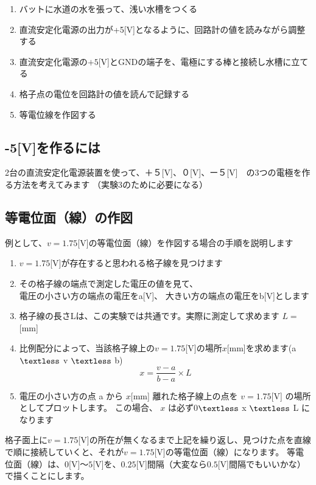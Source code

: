 \documentclass[uplatex,a4paper,11pt,oneside,openany]{jsbook}
\begin{document}
\begin{enumerate}
  \item バットに水道の水を張って、浅い水槽をつくる
  \item 直流安定化電源の出力が+5[V]となるように、回路計の値を読みながら調整する
  \item 直流安定化電源の$+5$[V]とGNDの端子を、電極にする棒と接続し水槽に立てる
  \item 格子点の電位を回路計の値を読んで記録する
  \item 等電位線を作図する
\end{enumerate}

\subsection{-5[V]を作るには}

2台の直流安定化電源装置を使って、＋５[V]、０[V]、ー５[V]　の3つの電極を作る方法を考えてみます
（実験3のために必要になる）

\newpage

\subsection{等電位面（線）の作図}

例として、$v=1.75$[V]の等電位面（線）を作図する場合の手順を説明します

\begin{enumerate}
  \item $v=1.75$[V]が存在すると思われる格子線を見つけます
  \item その格子線の端点で測定した電圧の値を見て、\\
  電圧の小さい方の端点の電圧をa[V]、
  大きい方の端点の電圧をb[V]とします
  \item 格子線の長さLは、この実験では共通です。実際に測定して求めます $L=$　　　[mm]
  \item 比例配分によって、当該格子線上の$v=1.75$[V]の場所$x$[mm]を求めます(a$\textless$ v $\textless$ b)
  \begin{equation*}x=\frac{v-a}{b-a}\times L\end{equation*}
  \item 電圧の小さい方の点 a から $x$[mm] 離れた格子線上の点を $v=1.75$[V] の場所としてプロットします。
  この場合、 $x$ は必ず0$\textless$ x $\textless$ L になります
\end{enumerate}

格子面上に$v=1.75$[V]の所在が無くなるまで上記を繰り返し、見つけた点を直線で順に接続していくと、それが$v=1.75$[V]の等電位面（線）になります。
等電位面（線）は、$0$[V]〜$5$[V]を、$0.25$[V]間隔（大変なら$0.5$[V]間隔でもいいかな）で描くことにします。
\end{document}
